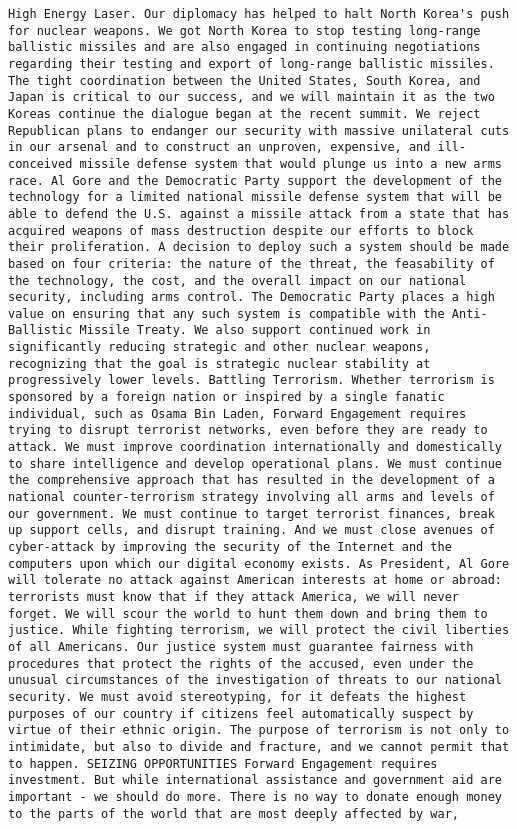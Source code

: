 \documentclass[
]{article}
\begin{document}
\begin{verbatim}
High Energy Laser. Our diplomacy has helped to halt North Korea's push for nuclear weapons. We got North Korea to stop testing long-range ballistic missiles and are also engaged in continuing negotiations regarding their testing and export of long-range ballistic missiles. The tight coordination between the United States, South Korea, and Japan is critical to our success, and we will maintain it as the two Koreas continue the dialogue began at the recent summit. We reject Republican plans to endanger our security with massive unilateral cuts in our arsenal and to construct an unproven, expensive, and ill-conceived missile defense system that would plunge us into a new arms race. Al Gore and the Democratic Party support the development of the technology for a limited national missile defense system that will be able to defend the U.S. against a missile attack from a state that has acquired weapons of mass destruction despite our efforts to block their proliferation. A decision to deploy such a system should be made based on four criteria: the nature of the threat, the feasability of the technology, the cost, and the overall impact on our national security, including arms control. The Democratic Party places a high value on ensuring that any such system is compatible with the Anti-Ballistic Missile Treaty. We also support continued work in significantly reducing strategic and other nuclear weapons, recognizing that the goal is strategic nuclear stability at progressively lower levels. Battling Terrorism. Whether terrorism is sponsored by a foreign nation or inspired by a single fanatic individual, such as Osama Bin Laden, Forward Engagement requires trying to disrupt terrorist networks, even before they are ready to attack. We must improve coordination internationally and domestically to share intelligence and develop operational plans. We must continue the comprehensive approach that has resulted in the development of a national counter-terrorism strategy involving all arms and levels of our government. We must continue to target terrorist finances, break up support cells, and disrupt training. And we must close avenues of cyber-attack by improving the security of the Internet and the computers upon which our digital economy exists. As President, Al Gore will tolerate no attack against American interests at home or abroad: terrorists must know that if they attack America, we will never forget. We will scour the world to hunt them down and bring them to justice. While fighting terrorism, we will protect the civil liberties of all Americans. Our justice system must guarantee fairness with procedures that protect the rights of the accused, even under the unusual circumstances of the investigation of threats to our national security. We must avoid stereotyping, for it defeats the highest purposes of our country if citizens feel automatically suspect by virtue of their ethnic origin. The purpose of terrorism is not only to intimidate, but also to divide and fracture, and we cannot permit that to happen. SEIZING OPPORTUNITIES Forward Engagement requires investment. But while international assistance and government aid are important - we should do more. There is no way to donate enough money to the parts of the world that are most deeply affected by war, 
\end{verbatim}
\end{document}
